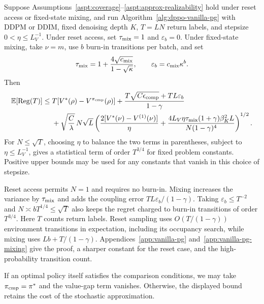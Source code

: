 \begin{thm}\label{thm:vanilla-pg-regret}
Suppose Assumptions~\ref{aspt:coverage}--\ref{aspt:approx-realizability} hold under reset access or fixed-state mixing, and run Algorithm~\ref{alg:dppo-vanilla-pg} with DDPM or DDIM, fixed denoising depth $K$, $T=LN$ return labels, and stepsize $0<\eta\leq L_V^{-1}$. Under reset access, set $\tau_{\rm mix}=1$ and $\varepsilon_b=0$. Under fixed-state mixing, take $\nu=m$, use $b$ burn-in transitions per batch, and set
\[
\tau_{\rm mix}=1+\frac{4\sqrt{c_{\rm mix}}}{1-\sqrt\kappa},
\qquad \varepsilon_b=c_{\rm mix}\kappa^b.
\]
Then
\begin{align*}
\mathbb{E}[\mathrm{Reg}(T)]\leq{}&
T[V^*(\rho)-V^{\pi_{\rm cmp}}(\rho)]
+\frac{T\sqrt{C\epsilon_{\rm comp}}+TL\varepsilon_b}{1-\gamma}\\
&+\sqrt{\frac C\lambda}\,N\sqrt L
\left(\frac{2[V^*(\nu)-V^{(1)}(\nu)]}{\eta}
+\frac{4L_V\eta\tau_{\rm mix}(1+\gamma)\beta_K^2L}
{N(1-\gamma)^4}\right)^{1/2}.
\end{align*}
For $N\leq\sqrt T$, choosing $\eta$ to balance the two terms in parentheses, subject to $\eta\leq L_V^{-1}$, gives a statistical term of order $T^{3/4}$ for fixed problem constants. Positive upper bounds may be used for any constants that vanish in this choice of stepsize.
\end{thm}
Reset access permits $N=1$ and requires no burn-in. Mixing increases the variance by $\tau_{\rm mix}$ and adds the coupling error $TL\varepsilon_b/(1-\gamma)$. Taking $\varepsilon_b\leq T^{-2}$ and $N\asymp bT^{1/4}\leq\sqrt T$ also keeps the regret charged to burn-in transitions of order $T^{3/4}$. Here $T$ counts return labels. Reset sampling uses $O(T/(1-\gamma))$ environment transitions in expectation, including its occupancy search, while mixing uses $Lb+T/(1-\gamma)$. Appendices~\ref{app:vanilla-pg} and~\ref{app:vanilla-pg-mixing} give the proof, a sharper constant for the reset case, and the high-probability transition count.

If an optimal policy itself satisfies the comparison conditions, we may take $\pi_{\rm cmp}=\pi^*$ and the value-gap term vanishes. Otherwise, the displayed bound retains the cost of the stochastic approximation.







